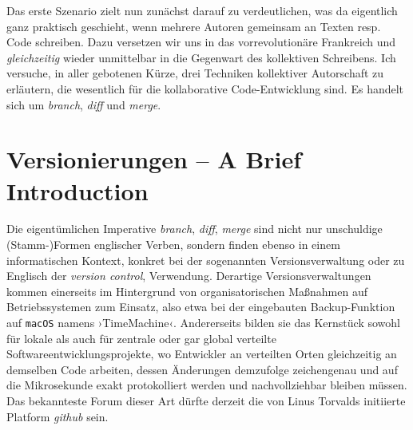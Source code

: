 \documentclass[a4paper,11pt]{article}
\newcommand{\inanf}[1]{›#1‹}
\begin{document}
Das erste Szenario zielt nun zunächst darauf zu verdeutlichen, was da eigentlich ganz praktisch geschieht, wenn mehrere Autoren gemeinsam an Texten resp. Code schreiben. Dazu versetzen wir uns in das vorrevolutionäre Frankreich und \emph{gleichzeitig} wieder unmittelbar in die Gegenwart des kollektiven Schreibens. Ich versuche, in aller gebotenen Kürze, drei Techniken kollektiver Autorschaft zu erläutern, die wesentlich für die kollaborative Code-Entwicklung sind. Es handelt sich um \emph{branch}, \emph{diff} und \emph{merge}. 

\section{Versionierungen – A Brief Introduction}

Die eigentümlichen Imperative \emph{branch}, \emph{diff}, \emph{merge} sind nicht nur unschuldige (Stamm-)Formen englischer Verben, sondern finden ebenso in einem informatischen Kontext, konkret bei der sogenannten Versionsverwaltung oder zu Englisch der \emph{version control}, Verwendung. Derartige Versionsverwaltungen kommen einerseits im Hintergrund von organisatorischen Maßnahmen auf Betriebssystemen zum Einsatz, also etwa bei der eingebauten Backup-Funktion auf \verb+macOS+ namens \inanf{TimeMachine}. Andererseits bilden sie das Kernstück sowohl für lokale als auch für zentrale oder gar global verteilte Softwareentwicklungsprojekte, wo Entwickler an verteilten Orten gleichzeitig an demselben Code arbeiten, dessen Änderungen demzufolge zeichengenau und auf die Mikrosekunde exakt protokolliert werden und nachvollziehbar bleiben müssen. Das bekannteste Forum dieser Art dürfte derzeit die von Linus Torvalds initiierte Platform \emph{github} sein. 
\end{document}
